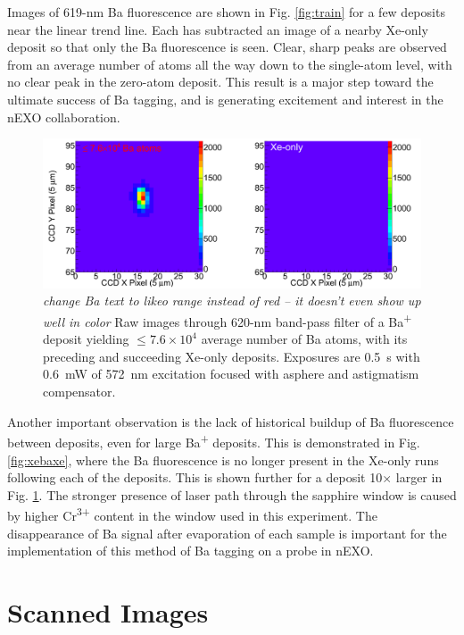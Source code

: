 Images of 619-nm Ba fluorescence are shown in Fig. \ref{fig:train} for a few deposits near the linear trend line.  Each has subtracted an image of a nearby Xe-only deposit so that only the Ba fluorescence is seen.  Clear, sharp peaks are observed from an average number of atoms all the way down to the single-atom level, with no clear peak in the zero-atom deposit.  This result is a major step toward the ultimate success of Ba tagging, and is generating excitement and interest in the nEXO collaboration.

\begin{figure} %
        \centering
                \includegraphics[width=.95\textwidth]{figures/xebaxe_largest_average.png}
                \caption{\emph{\color{gray}change Ba text to likeo range instead of red -- it doesn't even show up well in color} Raw images through 620-nm band-pass filter of a Ba\textsuperscript{+} deposit yielding $\leq 7.6 \times 10^{4}$ average number of Ba atoms, with its preceding and succeeding Xe-only deposits.  Exposures are 0.5~s with 0.6~mW of 572~nm excitation focused with asphere and astigmatism compensator.}
\label{fig:xebaxeLarger}
\end{figure}

Another important observation is the lack of historical buildup of Ba fluorescence between deposits, even for large Ba\textsuperscript{+} deposits.  This is demonstrated in Fig. \ref{fig:xebaxe}, where the Ba fluorescence is no longer present in the Xe-only runs following each of the deposits.  This is shown further for a deposit 10$\times$ larger in Fig. \ref{fig:xebaxeLarger}.  The stronger presence of laser path through the sapphire window is caused by higher Cr\textsuperscript{3+} content in the window used in this experiment.  The disappearance of Ba signal after evaporation of each sample is important for the implementation of this method of Ba tagging on a probe in nEXO.

\section{Scanned Images}
\label{sec:scanning}

